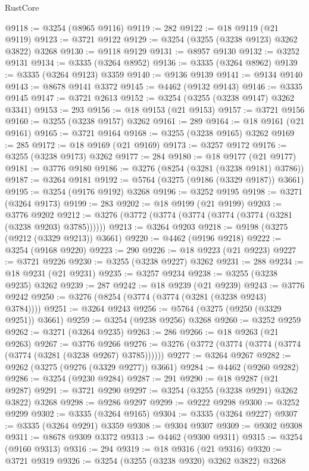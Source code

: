 \begin{lexlean}{RustCore}
\begin{coremodule}
@9118 := @3254 (@8965 @9116)
@9119 := 282
@9122 := @18 @9119 (@21 @9119)
@9123 := @3721 @9122
@9129 := @3254 (@3255 (@3238 @9123) @3262 @3822) @3268
@9130 := @9118 @9129
@9131 := @8957 @9130
@9132 := @3252 @9131
@9134 := @3335 (@3264 @8952)
@9136 := @3335 (@3264 @8962)
@9139 := @3335 (@3264 @9123) @3359
@9140 := @9136 @9139
@9141 := @9134 @9140
@9143 := @8678 @9141 @3372
@9145 := @4462 (@9132 @9143)
@9146 := @3335 @9145
@9147 := @3721 @2613
@9152 := @3254 (@3255 (@3238 @9147) @3262 @3341)
@9153 := 293
@9156 := @18 @9153 (@21 @9153)
@9157 := @3721 @9156
@9160 := @3255 (@3238 @9157) @3262
@9161 := 289
@9164 := @18 @9161 (@21 @9161)
@9165 := @3721 @9164
@9168 := @3255 (@3238 @9165) @3262
@9169 := 285
@9172 := @18 @9169 (@21 @9169)
@9173 := @3257 @9172
@9176 := @3255 (@3238 @9173) @3262
@9177 := 284
@9180 := @18 @9177 (@21 @9177)
@9181 := @3776 @9180
@9186 := @3276 (@8254 (@3281 (@3238 @9181) @3786))
@9187 := @3264 @9181
@9192 := @5764 (@3275 (@9186 (@3329 @9187)) @3661)
@9195 := @3254 (@9176 @9192) @3268
@9196 := @3252 @9195
@9198 := @3271 (@3264 @9173)
@9199 := 283
@9202 := @18 @9199 (@21 @9199)
@9203 := @3776 @9202
@9212 := @3276 (@3772 (@3774 (@3774 (@3774 (@3774 (@3281 (@3238 @9203) @3785))))))
@9213 := @3264 @9203
@9218 := @9198 (@3275 (@9212 (@3329 @9213)) @3661)
@9220 := @4462 (@9196 @9218)
@9222 := @3254 (@9168 @9220)
@9223 := 290
@9226 := @18 @9223 (@21 @9223)
@9227 := @3721 @9226
@9230 := @3255 (@3238 @9227) @3262
@9231 := 288
@9234 := @18 @9231 (@21 @9231)
@9235 := @3257 @9234
@9238 := @3255 (@3238 @9235) @3262
@9239 := 287
@9242 := @18 @9239 (@21 @9239)
@9243 := @3776 @9242
@9250 := @3276 (@8254 (@3774 (@3774 (@3281 (@3238 @9243) @3784))))
@9251 := @3264 @9243
@9256 := @5764 (@3275 (@9250 (@3329 @9251)) @3661)
@9259 := @3254 (@9238 @9256) @3268
@9260 := @3252 @9259
@9262 := @3271 (@3264 @9235)
@9263 := 286
@9266 := @18 @9263 (@21 @9263)
@9267 := @3776 @9266
@9276 := @3276 (@3772 (@3774 (@3774 (@3774 (@3774 (@3281 (@3238 @9267) @3785))))))
@9277 := @3264 @9267
@9282 := @9262 (@3275 (@9276 (@3329 @9277)) @3661)
@9284 := @4462 (@9260 @9282)
@9286 := @3254 (@9230 @9284)
@9287 := 291
@9290 := @18 @9287 (@21 @9287)
@9291 := @3721 @9290
@9297 := @3254 (@3255 (@3238 @9291) @3262 @3822) @3268
@9298 := @9286 @9297
@9299 := @9222 @9298
@9300 := @3252 @9299
@9302 := @3335 (@3264 @9165)
@9304 := @3335 (@3264 @9227)
@9307 := @3335 (@3264 @9291) @3359
@9308 := @9304 @9307
@9309 := @9302 @9308
@9311 := @8678 @9309 @3372
@9313 := @4462 (@9300 @9311)
@9315 := @3254 (@9160 @9313)
@9316 := 294
@9319 := @18 @9316 (@21 @9316)
@9320 := @3721 @9319
@9326 := @3254 (@3255 (@3238 @9320) @3262 @3822) @3268

\end{coremodule}
\end{lexlean}
